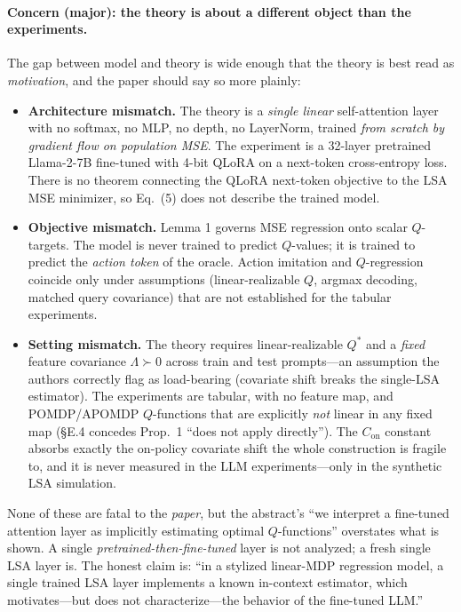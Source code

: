\documentclass[11pt]{article}
\newcommand{\Lam}{\Lambda}
\newcommand{\Con}{C_{\mathrm{on}}}
\begin{document}
\paragraph{Concern (major): the theory is about a different object than the experiments.} The
gap between model and theory is wide enough that the theory is best read as
\emph{motivation}, and the paper should say so more plainly:
\begin{itemize}[leftmargin=1.4em,itemsep=2pt,topsep=2pt]
  \item \textbf{Architecture mismatch.} The theory is a \emph{single linear} self-attention
  layer with no softmax, no MLP, no depth, no LayerNorm, trained \emph{from scratch by
  gradient flow on population MSE}. The experiment is a 32-layer pretrained Llama-2-7B fine-tuned
  with 4-bit QLoRA on a next-token cross-entropy loss. There is no theorem connecting the QLoRA
  next-token objective to the LSA MSE minimizer, so Eq.\ (5) does not describe the trained model.
  \item \textbf{Objective mismatch.} Lemma 1 governs MSE regression onto scalar $Q$-targets.
  The model is never trained to predict $Q$-values; it is trained to predict the
  \emph{action token} of the oracle. Action imitation and $Q$-regression coincide only under
  assumptions (linear-realizable $Q$, argmax decoding, matched query covariance) that are not
  established for the tabular experiments.
  \item \textbf{Setting mismatch.} The theory requires linear-realizable $Q^*$ and a
  \emph{fixed} feature covariance $\Lam\succ0$ across train and test prompts---an assumption the
  authors correctly flag as load-bearing (covariate shift breaks the single-LSA estimator). The
  experiments are tabular, with no feature map, and POMDP/APOMDP $Q$-functions that are
  explicitly \emph{not} linear in any fixed map (\S E.4 concedes Prop.\ 1 ``does not apply
  directly''). The $\Con$ constant absorbs exactly the on-policy covariate shift the whole
  construction is fragile to, and it is never measured in the LLM experiments---only in the
  synthetic LSA simulation.
\end{itemize}
None of these are fatal to the \emph{paper}, but the abstract's ``we interpret a fine-tuned
attention layer as implicitly estimating optimal $Q$-functions'' overstates what is shown. A
single \emph{pretrained-then-fine-tuned} layer is not analyzed; a fresh single LSA layer is.
The honest claim is: ``in a stylized linear-MDP regression model, a single trained LSA layer
implements a known in-context estimator, which motivates---but does not characterize---the
behavior of the fine-tuned LLM.''
\end{document}
